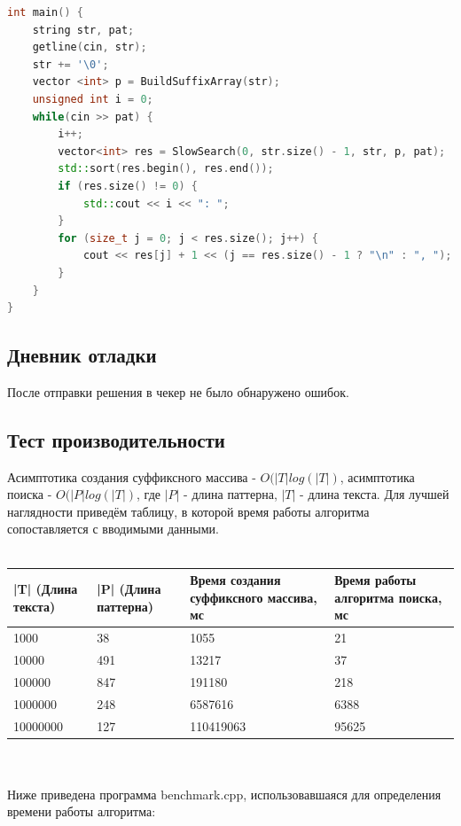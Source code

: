 \documentclass[12pt]{article}
\begin{document}
\begin{lstlisting}[language=C++]
int main() {
    string str, pat;
    getline(cin, str);
    str += '\0';
    vector <int> p = BuildSuffixArray(str);
    unsigned int i = 0;
    while(cin >> pat) {
        i++;
        vector<int> res = SlowSearch(0, str.size() - 1, str, p, pat);
        std::sort(res.begin(), res.end());
        if (res.size() != 0) {
            std::cout << i << ": ";
        }
        for (size_t j = 0; j < res.size(); j++) {
            cout << res[j] + 1 << (j == res.size() - 1 ? "\n" : ", ");
        }
    }
}
\end{lstlisting}

\subsection*{Дневник отладки}

После отправки решения в чекер не было обнаружено ошибок.

\subsection*{Тест производительности}
Асимптотика создания суффиксного массива - $O(|T|log(|T|)$, асимптотика поиска - $O(|P|log(|T|)$, где $|P|$ - длина паттерна, $|T|$ - длина текста.
Для лучшей наглядности приведём таблицу, в которой время работы алгоритма сопоставляется с вводимыми данными.
\\
\\
\begin{tabularx}{\textwidth}{ |X|X|X|X| }
    \hline
    |T| (Длина текста) & |P| (Длина паттерна) & Время создания суффиксного массива, мс & Время работы алгоритма поиска, мс \\
    \hline
    1000 & 38 & 1055 & 21 \\
    10000 & 491 & 13217 & 37 \\
    100000 & 847 & 191180 & 218 \\
    1000000 & 248 & 6587616 & 6388 \\
    10000000 & 127 & 110419063 & 95625 \\
    \hline
\end{tabularx}
\\
\\ 
Ниже приведена программа benchmark.cpp, использовавшаяся для определения времени работы алгоритма:
\end{document}
